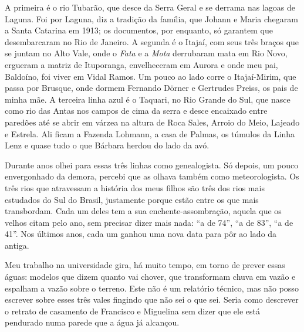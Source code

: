 \documentclass[
  brazilian,
  11pt,
  openany]{book}
\begin{document}
A primeira é o rio Tubarão, que desce da Serra Geral e se derrama nas
lagoas de Laguna. Foi por Laguna, diz a tradição da família, que Johann
e Maria chegaram a Santa Catarina em 1913; os documentos, por enquanto,
só garantem que desembarcaram no Rio de Janeiro. A segunda é o Itajaí,
com seus três braços que se juntam no Alto Vale, onde o \emph{Fata} e a
\emph{Mota} derrubaram mata em Rio Novo, ergueram a matriz de
Ituporanga, envelheceram em Aurora e onde meu pai, Baldoíno, foi viver
em Vidal Ramos. Um pouco ao lado corre o Itajaí-Mirim, que passa por
Brusque, onde dormem Fernando Dörner e Gertrudes Preiss, os pais de
minha mãe. A terceira linha azul é o Taquari, no Rio Grande do Sul, que
nasce como rio das Antas nos campos de cima da serra e desce encaixado
entre paredões até se abrir em várzea na altura de Roca Sales, Arroio do
Meio, Lajeado e Estrela. Ali ficam a Fazenda Lohmann, a casa de Palmas,
os túmulos da Linha Lenz e quase tudo o que Bárbara herdou do lado da
avó.

Durante anos olhei para essas três linhas como genealogista. Só depois,
um pouco envergonhado da demora, percebi que as olhava também como
meteorologista. Os três rios que atravessam a história dos meus filhos
são três dos rios mais estudados do Sul do Brasil, justamente porque
estão entre os que mais transbordam. Cada um deles tem a sua
enchente-assombração, aquela que os velhos citam pelo ano, sem precisar
dizer mais nada: ``a de 74'', ``a de 83'', ``a de 41''. Nos últimos
anos, cada um ganhou uma nova data para pôr ao lado da antiga.

Meu trabalho na universidade gira, há muito tempo, em torno de prever
essas águas: modelos que dizem quanto vai chover, que transformam chuva
em vazão e espalham a vazão sobre o terreno. Este não é um relatório
técnico, mas não posso escrever sobre esses três vales fingindo que não
sei o que sei. Seria como descrever o retrato de casamento de Francisco
e Miguelina sem dizer que ele está pendurado numa parede que a água já
alcançou.
\end{document}
